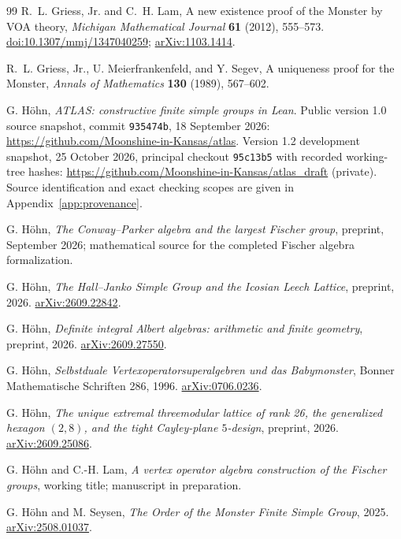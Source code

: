 \documentclass[11pt]{article}
\numberwithin{equation}{section}
\theoremstyle{definition}
\newcommand{\code}[1]{\texttt{\small #1}}
\begin{document}
\begin{thebibliography}{99}
R.~L. Griess, Jr. and C.~H. Lam,
A new existence proof of the Monster by VOA theory,
\emph{Michigan Mathematical Journal} \textbf{61} (2012), 555--573.
\href{https://doi.org/10.1307/mmj/1347040259}{doi:10.1307/mmj/1347040259};
\href{https://arxiv.org/abs/1103.1414}{arXiv:1103.1414}.

R.~L. Griess, Jr., U. Meierfrankenfeld, and Y. Segev,
A uniqueness proof for the Monster,
\emph{Annals of Mathematics} \textbf{130} (1989), 567--602.

G. H\"ohn, \emph{ATLAS: constructive finite simple groups in Lean}.
Public version 1.0 source snapshot, commit \code{935474b},
18 September 2026:
\url{https://github.com/Moonshine-in-Kansas/atlas}.
Version 1.2 development snapshot, 25 October 2026, principal checkout
\code{95c13b5} with recorded working-tree hashes:
\url{https://github.com/Moonshine-in-Kansas/atlas_draft} (private).
Source identification and exact checking scopes are given in
Appendix~\ref{app:provenance}.


G. H\"ohn,
\emph{The Conway--Parker algebra and the largest Fischer group},
preprint, September 2026; mathematical source for
the completed Fischer algebra formalization.

G. H\"ohn,
\emph{The Hall--Janko Simple Group and the Icosian Leech Lattice},
preprint, 2026.
\href{https://arxiv.org/abs/2609.22842}{arXiv:2609.22842}.

G. H\"ohn,
\emph{Definite integral Albert algebras: arithmetic and finite geometry},
preprint, 2026.
\href{https://arxiv.org/abs/2609.27550}{arXiv:2609.27550}.

G. H\"ohn, \emph{Selbstduale Vertexoperatorsuperalgebren und das
Babymonster}, Bonner Mathematische Schriften 286, 1996.
\href{https://arxiv.org/abs/0706.0236}{arXiv:0706.0236}.

G. H\"ohn,
\emph{The unique extremal threemodular lattice of rank 26, the
generalized hexagon $(2,8)$, and the tight Cayley-plane $5$-design},
preprint, 2026.
\href{https://arxiv.org/abs/2609.25086}{arXiv:2609.25086}.

G. H\"ohn and C.-H. Lam,
\emph{A vertex operator algebra construction of the Fischer groups},
working title; manuscript in preparation.

G. H\"ohn and M. Seysen,
\emph{The Order of the Monster Finite Simple Group}, 2025.
\href{https://arxiv.org/abs/2508.01037}{arXiv:2508.01037}.


\end{thebibliography}
\end{document}

